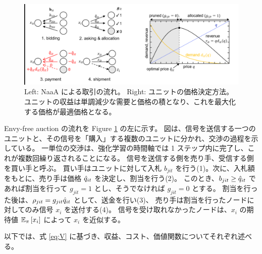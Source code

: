\begin{figure}[t]
\centering
\includegraphics[width=\linewidth]{img/double.eps}
\caption{
Left: NaaA による取引の流れ。
Right: ユニットの価格決定方法。ユニットの収益は単調減少な需要と価格の積となり、これを最大化する価格が最適価格となる。
}
\label{fig:double}
\end{figure}

Envy-free auction の流れを Figure \ref{fig:double} の左に示す。
図は、信号を送信する一つのユニットと、その信号を「購入」する複数のユニットに分かれ、交渉の過程を示している。
一単位の交渉は、強化学習の時間軸では 1 ステップ内に完了し、これが複数回繰り返されることになる。
信号を送信する側を売り手、受信する側を買い手と呼ぶ。
買い手はユニットに対して入札 $b_{jit}$ を行う(1)。次に、入札額をもとに、売り手は価格 ${\hat{q}}_{it}$ を決定し、割当を行う(2)。
このとき、$b_{jit} \ge {\hat{q}}_{it}$ であれば割当を行って $g_{jit} = 1$ とし、そうでなければ $g_{jit} = 0$ とする。
割当を行った後は、$\rho_{jit} = g_{jit} {\hat{q}}_{it}$ として、送金を行い(3)、
売り手は割当を行ったノードに対してのみ信号 $x_i$ を送付する(4)。
信号を受け取れなかったノードは、$x_i$ の期待値 $\mathbb{E}_{\pi}\left[ x_i \right]$ によって $x_i$ を近似する。

以下では、式 \ref{eq:V} に基づき、収益、コスト、価値関数についてそれぞれ述べる。




